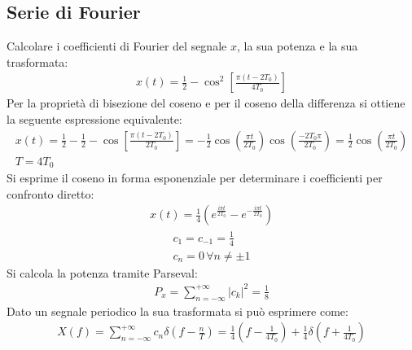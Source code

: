 \documentclass{article}
\begin{document}
\subsection{Serie di Fourier}
Calcolare i coefficienti di Fourier del segnale $x$, la sua potenza e la sua trasformata:
\begin{gather*}
    x(t)=\displaystyle\frac{1}{2}-\cos^2\left[\frac{\pi(t-2T_0)}{4T_0}\right]
\end{gather*}
Per la proprietà di bisezione del coseno e per il coseno della differenza si ottiene la seguente espressione equivalente:
\begin{gather*}
    x(t)=\displaystyle\frac{1}{2}-\frac{1}{2}-\cos\left[\frac{\pi(t-2T_0)}{2T_0}\right]=-\frac{1}{2}\cos\left(\frac{\pi t}{2T_0}\right)\cos\left(\frac{-2T_0\pi}{2T_0}\right)=\frac{1}{2}\cos\left(\frac{\pi t}{2T_0}\right)\\
    T=4T_0
\end{gather*}
Si esprime il coseno in forma esponenziale per determinare i coefficienti per confronto diretto:
\begin{gather*}
    x(t)=\displaystyle\frac{1}{4}\left(e^{\frac{i\pi t}{2T_0}}-e^{-\frac{i\pi t}{2T_0}}\right)
\end{gather*}
\begin{gather}
    c_1=c_{-1}=\displaystyle\frac{1}{4}\\
    c_n=0\,\forall n\neq\pm1
\end{gather}
Si calcola la potenza tramite Parseval:
\begin{gather}
    P_x=\displaystyle\sum_{n=-\infty}^{+\infty}|c_k|^2=\frac{1}{8}
\end{gather}
Dato un segnale periodico la sua trasformata si può esprimere come:
\begin{gather}
    X(f)=\displaystyle\sum_{n=-\infty}^{+\infty}c_n\delta\left(f-\frac{n}{T}\right)=\frac{1}{4}\left(f-\frac{1}{4T_0}\right)+\frac{1}{4}\delta\left(f+\frac{1}{4T_0}\right)
\end{gather}
\end{document}
